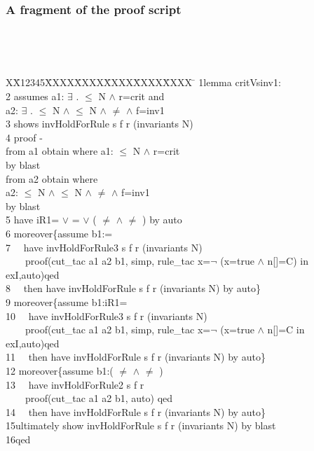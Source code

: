 \documentclass{beamer}
\newlength{\fminilength}
\newenvironment{fmini}[1][\linewidth]
  {\setlength{\fminilength}{#1\fboxsep-2\fboxrule}%
   \vspace{2ex}\noindent\begin{lrbox}{\fminibox}\begin{minipage}{\fminilength}%
   \mbox{ }\hfill\vspace{-2.5ex}}%
  {\end{minipage}\end{lrbox}\vspace{1ex}\hspace{0ex}%
   \framebox{\usebox{\fminibox}}}
\newenvironment{specification}
{\noindent\scriptsize
\tt\begin{fmini}\begin{tabbing}X\=X12345\=XXXX\=XXXX\=XXXX\=XXXX\=XXXX
\=\+\kill} {\end{tabbing}\normalfont\end{fmini}}
\def \twoSpaces {\ \ }
\def \andc {\wedge }
\def \negc {\neg }
\begin{document}
 
\begin{frame}\frametitle{ A fragment of the proof script}
\begin{specification}
1lemma critVsinv1:\\
2  assumes  a1: $\exists$ .  $\le$ N $\wedge$ r=crit  and \\
  a2: $\exists$   .  $\le$ N $\wedge$  $\le$ N $\wedge$  $\neq$  $\wedge$ f=inv1   \\
3  shows  invHoldForRule s f r (invariants
  N)\\
4  proof -\\
   from a1 obtain  where a1: $\le$ N $\wedge$ r=crit  \\
   by blast\\
   from a2 obtain   where \\
   a2:  $\le$ N $\wedge$  $\le$ N $\wedge$  $\neq$  $\wedge$ f=inv1   \\
   by blast \\
5  have iR1= $\vee$ = $\vee$ ( $\ne$  $\wedge$   $\ne$ ) by auto\\

6  moreover\{assume  b1:=\\
7  \twoSpaces have invHoldForRule3 s f r (invariants N)\\
 \twoSpaces  \twoSpaces   proof(cut\_tac a1 a2 b1, simp, rule\_tac x=$\negc$ (x=true $\andc$ n[]=C)  in exI,auto)qed\\
8  \twoSpaces then have invHoldForRule s f r
(invariants
  N)
by auto\}\\

9  moreover\{assume  b1:iR1=\\
10 \twoSpaces have invHoldForRule3 s f r (invariants N)\\
 \twoSpaces \twoSpaces   proof(cut\_tac a1 a2 b1, simp, rule\_tac x=$\negc$ (x=true $\andc$ n[]=C  in exI,auto)qed\\
11 \twoSpaces then have invHoldForRule s f r (invariants
  N)
by auto\}\\

12   moreover\{assume  b1:( $\ne$   $\wedge$    $\ne$  )\\
13 \twoSpaces have invHoldForRule2 s f r  \\
  \twoSpaces \twoSpaces  proof(cut\_tac a1 a2 b1,  auto) qed\\
14 \twoSpaces then have invHoldForRule s f r
(invariants
  N)
by auto\} \\

15ultimately show invHoldForRule s f r
(invariants N) by blast\\
16qed\\
\end{specification}

 \end{frame} 
\end{document}
